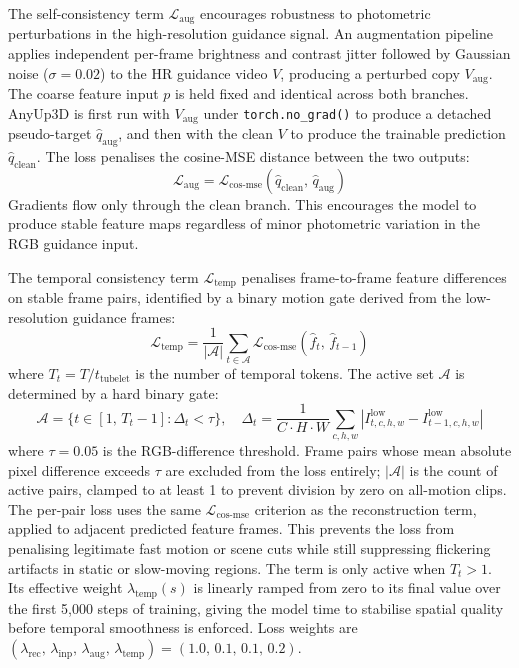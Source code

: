The self-consistency term $\mathcal{L}_{\mathrm{aug}}$ encourages robustness to photometric perturbations in the high-resolution guidance signal. An augmentation pipeline applies independent per-frame brightness and contrast jitter followed by Gaussian noise ($\sigma = 0.02$) to the HR guidance video $V$, producing a perturbed copy $V_{\mathrm{aug}}$. The coarse feature input $p$ is held fixed and identical across both branches. AnyUp3D is first run with $V_{\mathrm{aug}}$ under \texttt{torch.no\_grad()} to produce a detached pseudo-target $\hat{q}_{\mathrm{aug}}$, and then with the clean $V$ to produce the trainable prediction $\hat{q}_{\mathrm{clean}}$. The loss penalises the cosine-MSE distance between the two outputs:
\begin{equation}
\mathcal{L}_{\mathrm{aug}} = \mathcal{L}_{\mathrm{cos\text{-}mse}}(\hat{q}_{\mathrm{clean}},\, \hat{q}_{\mathrm{aug}})
\end{equation}
Gradients flow only through the clean branch. This encourages the model to produce stable feature maps regardless of minor photometric variation in the RGB guidance input.

The temporal consistency term $\mathcal{L}_{\mathrm{temp}}$ penalises frame-to-frame feature differences on stable frame pairs, identified by a binary motion gate derived from the low-resolution guidance frames:
\begin{equation}
\mathcal{L}_{\mathrm{temp}} = \frac{1}{|\mathcal{A}|}\sum_{t \in \mathcal{A}} \mathcal{L}_{\mathrm{cos\text{-}mse}}(\hat{f}_t,\, \hat{f}_{t-1})
\end{equation}
where $T_t = T / t_{\text{tubelet}}$ is the number of temporal tokens. The active set $\mathcal{A}$ is determined by a hard binary gate:
\begin{equation}
\mathcal{A} = \bigl\{t \in [1,\,T_t{-}1] : \Delta_t < \tau \bigr\}, \quad
\Delta_t = \frac{1}{C \cdot H \cdot W}\sum_{c,h,w} \left| I^{\mathrm{low}}_{t,c,h,w} - I^{\mathrm{low}}_{t-1,c,h,w} \right|
\end{equation}
where $\tau = 0.05$ is the RGB-difference threshold. Frame pairs whose mean absolute pixel difference exceeds $\tau$ are excluded from the loss entirely; $|\mathcal{A}|$ is the count of active pairs, clamped to at least 1 to prevent division by zero on all-motion clips. The per-pair loss uses the same $\mathcal{L}_{\mathrm{cos\text{-}mse}}$ criterion as the reconstruction term, applied to adjacent predicted feature frames. This prevents the loss from penalising legitimate fast motion or scene cuts while still suppressing flickering artifacts in static or slow-moving regions. The term is only active when $T_t > 1$. Its effective weight $\lambda_{\mathrm{temp}}(s)$ is linearly ramped from zero to its final value over the first 5{,}000 steps of training, giving the model time to stabilise spatial quality before temporal smoothness is enforced. Loss weights are $(\lambda_{\mathrm{rec}},\,\lambda_{\mathrm{inp}},\,\lambda_{\mathrm{aug}},\,\lambda_{\mathrm{temp}}) = (1.0,\,0.1,\,0.1,\,0.2)$.

